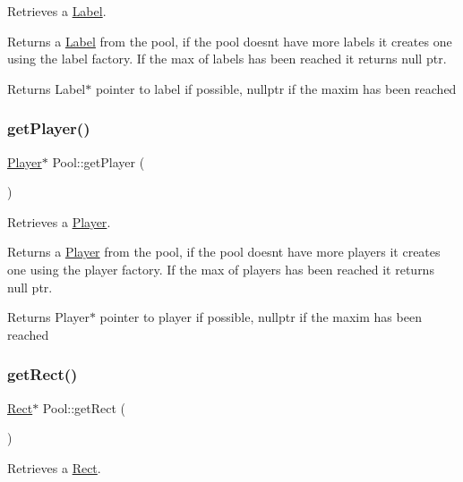 Retrieves a \hyperlink{class_label}{Label}. 

Returns a \hyperlink{class_label}{Label} from the pool, if the pool doesn\textquotesingle{}t have more labels it creates one using the label factory. If the max of labels has been reached it returns null ptr.

\begin{DoxyReturn}{Returns}
Label$\ast$ pointer to label if possible, nullptr if the maxim has been reached 
\end{DoxyReturn}
\mbox{\label{class_pool_a15d6bbd0901a4a77fd55eb0b69d965ef}} 
\subsubsection{\texorpdfstring{get\+Player()}{getPlayer()}}
{\footnotesize\ttfamily \hyperlink{class_player}{Player}$\ast$ Pool\+::get\+Player (\begin{DoxyParamCaption}{ }\end{DoxyParamCaption})}



Retrieves a \hyperlink{class_player}{Player}. 

Returns a \hyperlink{class_player}{Player} from the pool, if the pool doesn\textquotesingle{}t have more players it creates one using the player factory. If the max of players has been reached it returns null ptr.

\begin{DoxyReturn}{Returns}
Player$\ast$ pointer to player if possible, nullptr if the maxim has been reached 
\end{DoxyReturn}
\mbox{\label{class_pool_a2ea49e227ce14fcb926d451f9f59e452}} 
\subsubsection{\texorpdfstring{get\+Rect()}{getRect()}}
{\footnotesize\ttfamily \hyperlink{class_rect}{Rect}$\ast$ Pool\+::get\+Rect (\begin{DoxyParamCaption}{ }\end{DoxyParamCaption})}



Retrieves a \hyperlink{class_rect}{Rect}. 

